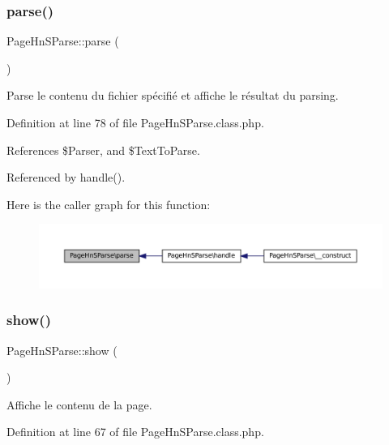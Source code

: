 \subsubsection{\texorpdfstring{parse()}{parse()}}
{\footnotesize\ttfamily Page\+Hn\+S\+Parse\+::parse (\begin{DoxyParamCaption}{ }\end{DoxyParamCaption})\hspace{0.3cm}{\ttfamily [protected]}}

Parse le contenu du fichier spécifié et affiche le résultat du parsing. 

Definition at line 78 of file Page\+Hn\+S\+Parse.\+class.\+php.



References \$\+Parser, and \$\+Text\+To\+Parse.



Referenced by handle().

Here is the caller graph for this function\+:\nopagebreak
\begin{figure}[H]
\begin{center}
\leavevmode
\includegraphics[width=350pt]{class_page_hn_s_parse_ac1c8575cca2948593c34fe434340e62c_icgraph}
\end{center}
\end{figure}
\mbox{\label{class_page_hn_s_parse_a26a8990f74656c2f519905ee7005683a}} 
\subsubsection{\texorpdfstring{show()}{show()}}
{\footnotesize\ttfamily Page\+Hn\+S\+Parse\+::show (\begin{DoxyParamCaption}{ }\end{DoxyParamCaption})\hspace{0.3cm}{\ttfamily [protected]}}

Affiche le contenu de la page. 

Definition at line 67 of file Page\+Hn\+S\+Parse.\+class.\+php.



